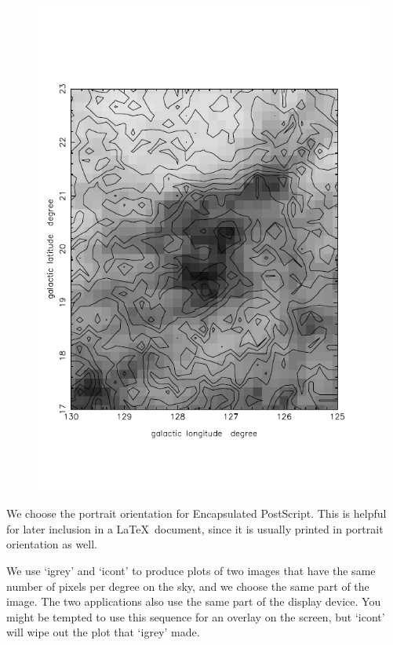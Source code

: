 \documentclass[11pt,twoside]{article}
\begin{document}
\begin{figure}[htb]
\begin{center}
\includegraphics{sun86_hard}
\end{center}
\end{figure}

   We choose the portrait orientation for Encapsulated PostScript. This
   is helpful for later inclusion in a \LaTeX\ document, since it is
   usually printed in portrait orientation as well.

   We use `igrey' and `icont' to produce plots of two images that have
   the same number of pixels per degree on the sky, and we choose the
   same part of the image. The two applications also use the same part
   of the display device. You might be tempted to use this sequence for
   an overlay on the screen, but `icont' will wipe out the plot that
   `igrey' made.
\end{document}
